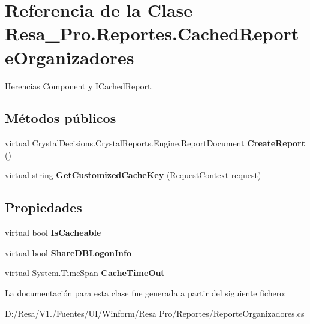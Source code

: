 \section{Referencia de la Clase Resa\+\_\+\+Pro.\+Reportes.\+Cached\+Reporte\+Organizadores}
\label{class_resa___pro_1_1_reportes_1_1_cached_reporte_organizadores}


Herencias Component y I\+Cached\+Report.

\subsection*{Métodos públicos}
\begin{DoxyCompactItemize}
\item 
virtual Crystal\+Decisions.\+Crystal\+Reports.\+Engine.\+Report\+Document {\bfseries Create\+Report} ()\label{class_resa___pro_1_1_reportes_1_1_cached_reporte_organizadores_a2c3f3cc2888eaf5f8d7c2dde5830ae13}

\item 
virtual string {\bfseries Get\+Customized\+Cache\+Key} (Request\+Context request)\label{class_resa___pro_1_1_reportes_1_1_cached_reporte_organizadores_ab6e97987376f8ef7b3a5b0f7b4ee6926}

\end{DoxyCompactItemize}
\subsection*{Propiedades}
\begin{DoxyCompactItemize}
\item 
virtual bool {\bfseries Is\+Cacheable}\hspace{0.3cm}{\ttfamily  [get, set]}\label{class_resa___pro_1_1_reportes_1_1_cached_reporte_organizadores_a64e6cd41de4e4e4dca3d4752f0817443}

\item 
virtual bool {\bfseries Share\+D\+B\+Logon\+Info}\hspace{0.3cm}{\ttfamily  [get, set]}\label{class_resa___pro_1_1_reportes_1_1_cached_reporte_organizadores_a02dfcd7cd06e5a822f6bab7df0c5824a}

\item 
virtual System.\+Time\+Span {\bfseries Cache\+Time\+Out}\hspace{0.3cm}{\ttfamily  [get, set]}\label{class_resa___pro_1_1_reportes_1_1_cached_reporte_organizadores_aaa7be486f9b024ba151ef7c021a8f902}

\end{DoxyCompactItemize}


La documentación para esta clase fue generada a partir del siguiente fichero\+:\begin{DoxyCompactItemize}
\item 
D\+:/\+Resa/\+V1./\+Fuentes/\+U\+I/\+Winform/\+Resa Pro/\+Reportes/Reporte\+Organizadores.\+cs\end{DoxyCompactItemize}
